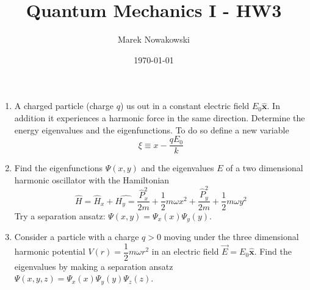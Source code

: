 \documentclass[11pt,letterpaper]{article}%
\title{\textbf{Quantum Mechanics I - HW3}}
\author{Marek Nowakowski}
\date{\today}
\newcommand{\xhat}{\hat{\textbf{x}}}
\begin{document}
\maketitle

\begin{enumerate}[label=\Large{\textbf{\arabic*.}}]

\item{
A charged particle (charge $q$) us out in a constant electric field $E_0\xhat$. In addition it experiences a harmonic force in the same direction. Determine the energy eigenvalues and the eigenfunctions. To do so define a new variable
\begin{equation}
\label{variable}
\xi \equiv x - \frac{qE_0}{k}
\end{equation}
}

\item{
Find the eigenfunctions $\Psi(x,y)$ and the eigenvalues $E$ of a two dimensional harmonic oscillator with the Hamiltonian
\begin{equation}
\label{hamiltonian}
\hat{H} = \hat{H}_x + \hat{H_y = }\frac{\hat{P}_x^2}{2m} +  \frac{1}{2}m\omega x^2 + \frac{\hat{P}_y^2}{2m} +  \frac{1}{2}m\omega y^2
\end{equation}
Try a separation ansatz: $\Psi(x,y) = \Psi_x(x)\Psi_y(y)$.
}

\item{
Consider a particle with a charge $q>0$ moving under the three dimensional harmonic potential $V(r) = \dfrac{1}{2}m\omega r^2$ in an electric field $\vec{E} = E_0\xhat$. Find the eigenvalues by making a separation ansatz $\Psi(x,y,z) = \Psi_x(x)\Psi_y(y)\Psi_z(z)$.
}


\end{enumerate}
\end{document}
